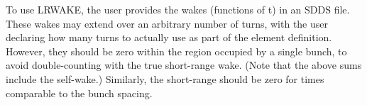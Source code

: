 To use LRWAKE, the user provides the wakes (functions of t) in an SDDS file.
These wakes may extend over an arbitrary number of turns, with the user declaring how many turns
to actually use as part of the element definition.
However, they should be zero within the region occupied by a single bunch, to avoid
double-counting with the true short-range wake.
(Note that the above sums include the self-wake.)
Similarly, the short-range should be zero for times comparable to the bunch spacing.

